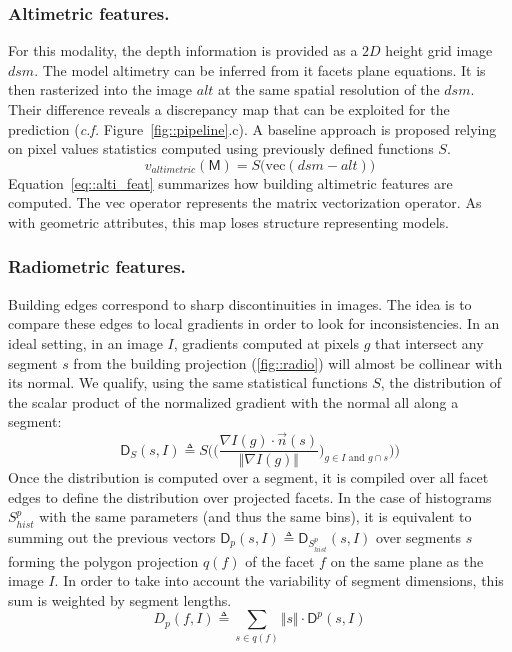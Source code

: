 \documentclass[runningheads]{llncs}
\begin{document}
\subsubsection{Altimetric features.}
For this modality, the depth information is provided as a $2D$ height grid image $dsm$. The model altimetry can be inferred from it facets plane equations. It is then rasterized into the image $alt$ at the same spatial resolution of the $dsm$. Their difference reveals a discrepancy map that can be exploited for the prediction (\textit{c.f.} Figure~\ref{fig::pipeline}.c). A baseline approach is proposed relying on pixel values statistics computed using previously defined functions $S$.
\begin{equation}
	\label{eq::alti_feat}
    v_{altimetric}(\mathsf{M}) = S\big( \mathrm{vec}(dsm - alt) \big)
\end{equation}
Equation~\ref{eq::alti_feat} summarizes how building altimetric features are computed. The $\mathrm{vec}$ operator represents the matrix vectorization operator. As with geometric attributes, this map loses structure representing models.

\subsubsection{Radiometric features.}
Building edges correspond to sharp discontinuities in images. The idea is to compare these edges to local gradients in order to look for inconsistencies. In an ideal setting, in an image $I$, gradients computed at pixels $g$ that intersect any segment $s$ from the building projection (\ref{fig::radio}) will almost be collinear with its normal. We qualify, using the same statistical functions $S$, the distribution of the scalar product of the normalized gradient with the normal all along a segment:
\begin{equation}
	\label{eq::corr_seg}
    \mathsf{D}_S(s, I) \triangleq S \bigg( \Big(\frac{\nabla I(g) \cdot \vec{n}(s)}{\Vert \nabla I(g)\Vert})_{g \in I \textrm{ and } g \cap s} \Big)\bigg)
\end{equation}
Once the distribution is computed over a segment, it is compiled over all facet edges to define the distribution over projected facets. In the case of histograms $S_{hist}^p$ with the same parameters (and thus the same bins), it is equivalent to summing out the previous vectors $\mathsf{D}_p(s, I) \triangleq \mathsf{D}_{S_{hist}^p}(s, I) $ over segments $s$ forming the polygon projection $q(f)$ of the facet $f$ on the same plane as the image $I$. In order to take into account the variability of segment dimensions, this sum is weighted by segment lengths.
\begin{equation}
	\label{eq::corr_fac}
	D_p(f, I) \triangleq \sum_{s \in q(f)} \Vert s \Vert \cdot \mathsf{D}^p(s, I)
\end{equation}
\end{document}
